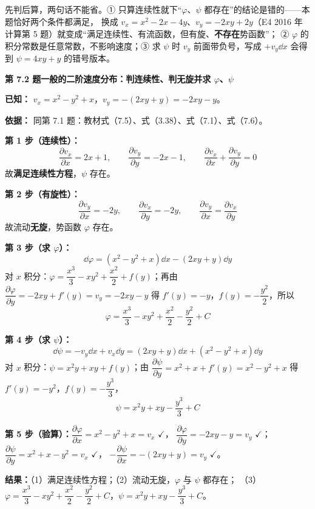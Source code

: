 \begin{yicuo}
先判后算，两句话不能省。① 只算连续性就下“$\varphi$、$\psi$ 都存在”的结论是错的——本题恰好两个条件都满足，
换成 $v_x=x^2-2x-4y$、$v_y=-2xy+2y$（E4 2016 年计算第 5 题）就变成“满足连续性、有流函数，但有旋、\textbf{不存在}势函数”；
② $\varphi$ 的积分常数是任意常数，不影响速度；③ 求 $\psi$ 时 $v_y$ 前面带负号，写成 $+v_y\dd x$ 会得到 $\psi=4xy+y$ 的错号版本。
\end{yicuo}

\noindent\textbf{第 7.2 题\quad 一般的二阶速度分布：判连续性、判无旋并求 $\varphi$、$\psi$}

\begin{jie}
\textbf{已知：} $v_x=x^2-y^2+x$，$v_y=-(2xy+y)=-2xy-y$。

\textbf{依据：} 同第 7.1 题：教材式（7.5）、式（3.38）、式（7.1）、式（7.6）。

\textbf{第 1 步（连续性）：}
\[
\frac{\partial v_x}{\partial x}=2x+1,\qquad \frac{\partial v_y}{\partial y}=-2x-1,\qquad
\frac{\partial v_x}{\partial x}+\frac{\partial v_y}{\partial y}=0
\]
故\textbf{满足连续性方程}，$\psi$ 存在。

\textbf{第 2 步（有旋性）：}
\[
\frac{\partial v_y}{\partial x}=-2y,\qquad \frac{\partial v_x}{\partial y}=-2y,\qquad
\frac{\partial v_y}{\partial x}=\frac{\partial v_x}{\partial y}
\]
故流动\textbf{无旋}，势函数 \(\varphi\) 存在。

\textbf{第 3 步（求 $\varphi$）：}
\[
\dd\varphi=(x^2-y^2+x)\dd x-(2xy+y)\dd y
\]
对 $x$ 积分：$\varphi=\dfrac{x^3}{3}-xy^2+\dfrac{x^2}{2}+f(y)$；再由
$\dfrac{\partial\varphi}{\partial y}=-2xy+f'(y)=v_y=-2xy-y$ 得 $f'(y)=-y$，$f(y)=-\dfrac{y^2}{2}$，所以
\[
\varphi=\frac{x^3}{3}-xy^2+\frac{x^2}{2}-\frac{y^2}{2}+C
\]

\textbf{第 4 步（求 $\psi$）：}
\[
\dd\psi=-v_y\dd x+v_x\dd y=(2xy+y)\dd x+(x^2-y^2+x)\dd y
\]
对 $x$ 积分：$\psi=x^2y+xy+f(y)$；由 $\dfrac{\partial\psi}{\partial y}=x^2+x+f'(y)=x^2-y^2+x$ 得 $f'(y)=-y^2$，$f(y)=-\dfrac{y^3}{3}$，
\[
\psi=x^2y+xy-\frac{y^3}{3}+C
\]

\textbf{第 5 步（验算）：}$\dfrac{\partial\varphi}{\partial x}=x^2-y^2+x=v_x$ $\checkmark$，
$\dfrac{\partial\varphi}{\partial y}=-2xy-y=v_y$ $\checkmark$；$\dfrac{\partial\psi}{\partial y}=x^2+x-y^2=v_x$ $\checkmark$，
$-\dfrac{\partial\psi}{\partial x}=-(2xy+y)=v_y$ $\checkmark$。

\textbf{结果：}（1）满足连续性方程；（2）流动无旋，$\varphi$ 与 $\psi$ 都存在；
（3）$\varphi=\dfrac{x^3}{3}-xy^2+\dfrac{x^2}{2}-\dfrac{y^2}{2}+C$，$\psi=x^2y+xy-\dfrac{y^3}{3}+C$。
\end{jie}

